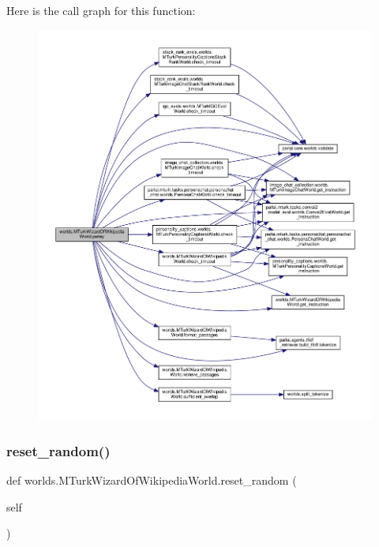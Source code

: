 Here is the call graph for this function\+:
\nopagebreak
\begin{figure}[H]
\begin{center}
\leavevmode
\includegraphics[width=350pt]{classworlds_1_1MTurkWizardOfWikipediaWorld_ad49b2e40a83896f6d0e67928f661d1c1_cgraph}
\end{center}
\end{figure}
\mbox{\label{classworlds_1_1MTurkWizardOfWikipediaWorld_a45710d2207e28b30a51192a536a3b796}} 
\subsubsection{\texorpdfstring{reset\+\_\+random()}{reset\_random()}}
{\footnotesize\ttfamily def worlds.\+M\+Turk\+Wizard\+Of\+Wikipedia\+World.\+reset\+\_\+random (\begin{DoxyParamCaption}\item[{}]{self }\end{DoxyParamCaption})}



